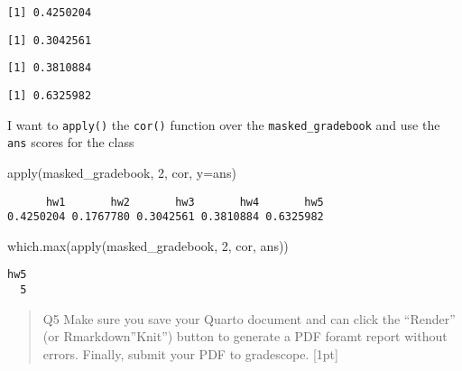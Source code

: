 \documentclass[
  letterpaper,
  DIV=11,
  numbers=noendperiod]{scrartcl}
\newenvironment{Shaded}{\begin{snugshade}}{\end{snugshade}}
\newcommand{\AttributeTok}[1]{\textcolor[rgb]{0.40,0.45,0.13}{#1}}
\newcommand{\DecValTok}[1]{\textcolor[rgb]{0.68,0.00,0.00}{#1}}
\newcommand{\FunctionTok}[1]{\textcolor[rgb]{0.28,0.35,0.67}{#1}}
\newcommand{\NormalTok}[1]{\textcolor[rgb]{0.00,0.23,0.31}{#1}}
\newcommand{\SpecialCharTok}[1]{\textcolor[rgb]{0.37,0.37,0.37}{#1}}
\begin{document}
\begin{verbatim}
[1] 0.4250204
\end{verbatim}

\begin{Shaded}
\end{Shaded}

\begin{verbatim}
[1] 0.3042561
\end{verbatim}

\begin{Shaded}
\end{Shaded}

\begin{verbatim}
[1] 0.3810884
\end{verbatim}

\begin{Shaded}
\end{Shaded}

\begin{verbatim}
[1] 0.6325982
\end{verbatim}

I want to \texttt{apply()} the \texttt{cor()} function over the
\texttt{masked\_gradebook} and use the \texttt{ans} scores for the class

\begin{Shaded}
\begin{Highlighting}[]
\FunctionTok{apply}\NormalTok{(masked\_gradebook, }\DecValTok{2}\NormalTok{, cor, }\AttributeTok{y=}\NormalTok{ans)}
\end{Highlighting}
\end{Shaded}

\begin{verbatim}
      hw1       hw2       hw3       hw4       hw5 
0.4250204 0.1767780 0.3042561 0.3810884 0.6325982 
\end{verbatim}

\begin{Shaded}
\begin{Highlighting}[]
\FunctionTok{which.max}\NormalTok{(}\FunctionTok{apply}\NormalTok{(masked\_gradebook, }\DecValTok{2}\NormalTok{, cor, ans))}
\end{Highlighting}
\end{Shaded}

\begin{verbatim}
hw5 
  5 
\end{verbatim}

\begin{quote}
Q5 Make sure you save your Quarto document and can click the ``Render''
(or Rmarkdown''Knit'') button to generate a PDF foramt report without
errors. Finally, submit your PDF to gradescope. {[}1pt{]}
\end{quote}
\end{document}
